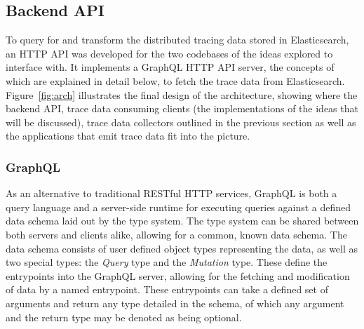 \documentclass[12pt,pdftex,titlepage]{report}
\begin{document}
            \subsection{Backend API}
                To query for and transform the distributed tracing data stored in Elasticsearch, an HTTP API was developed for the two codebases of the ideas explored to interface with.
                It implements a GraphQL HTTP API server, the concepts of which are explained in detail below, to fetch the trace data from Elasticsearch. Figure~\ref{fig:arch} illustrates
                the final design of the architecture, showing where the backend API, trace data consuming clients (the implementations of the ideas that will be discussed), trace data collectors
                outlined in the previous section as well as the applications that emit trace data fit into the picture.

                \subsubsection{GraphQL}
                    As an alternative to traditional RESTful HTTP services, GraphQL is both a query language and a server-side runtime for executing queries against a defined data schema
                    laid out by the type system. The type system can be shared between both servers and clients alike, allowing for a common, known data schema. The data schema consists of 
                    user defined object types representing the data, as well as two special types: the \textit{Query} type and the \textit{Mutation} type. These define the entrypoints into
                    the GraphQL server, allowing for the fetching and modification of data by a named entrypoint. These entrypoints can take a defined set of arguments and return any type
                    detailed in the schema, of which any argument and the return type may be denoted as being optional.
\end{document}
